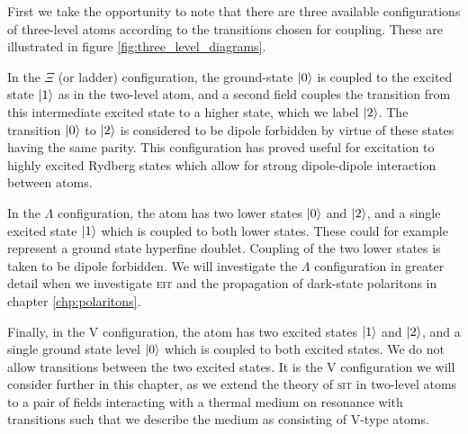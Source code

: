     First we take the opportunity to note that there are three available
    configurations of three-level atoms according to the transitions chosen for
    coupling. These are illustrated in figure \ref{fig:three_level_diagrams}.

    In the $\Xi$ (or ladder) configuration, the ground-state $\Ket{0}$ is
    coupled to the excited state $\Ket{1}$ as in the two-level atom, and a
    second field couples the transition from this intermediate excited state to
    a higher state, which we label $\Ket{2}$. The transition $\Ket{0}$ to
    $\Ket{2}$ is considered to be dipole forbidden by virtue of these states
    having the same parity. This configuration has proved useful for excitation
    to highly excited Rydberg states which allow for strong dipole-dipole
    interaction between atoms.\cite{Pritchard2010}

    In the $\Lambda$ configuration, the atom has two lower states $\Ket{0}$ and
    $\Ket{2}$, and a single excited state $\Ket{1}$ which is coupled to both
    lower states. These could for example represent a ground state hyperfine
    doublet. Coupling of the two lower states is taken to be dipole forbidden.
    We will investigate the $\Lambda$ configuration in greater detail when we
    investigate \textsc{eit} and the propagation of dark-state polaritons in
    chapter \ref{chp:polaritons}.

    Finally, in the V configuration, the atom has two excited states $\Ket{1}$
    and $\Ket{2}$, and a single ground state level $\Ket{0}$ which is coupled to
    both excited states. We do not allow transitions between the two excited
    states. It is the V configuration we will consider further in this chapter,
    as we extend the theory of \textsc{sit} in two-level atoms to a pair of
    fields interacting with a thermal medium on resonance with transitions such
    that we describe the medium as consisting of V-type atoms.
